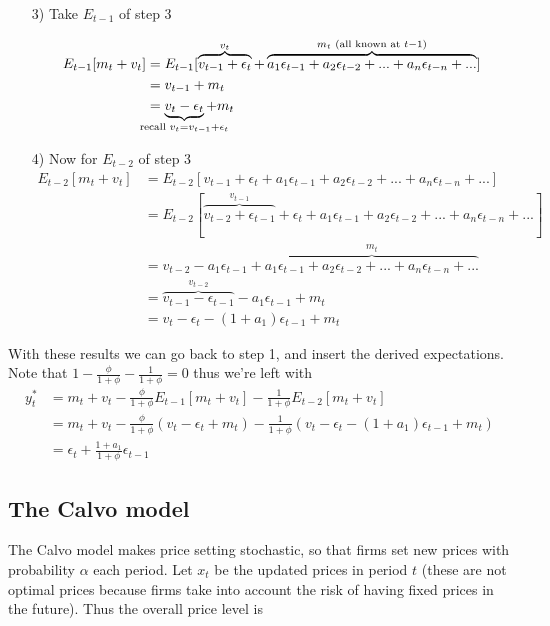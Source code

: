 \documentclass[12pt, a4paper]{article}
\begin{document}
\begin{spacing}{1.213}
\begin{itemize}
\item[3)] Take $E_{t-1}$ of step 3

\begin{align*}
E_{t-1}[m_t + v_t] &= E_{t-1}[\overbrace{v_{t-1} + \epsilon_t}^{v_t} + \overbrace { a_1 \epsilon_{t-1} + a_2 \epsilon_{t-2} + ... + a_{n} \epsilon_{t-n} + ...}^{m_t \textrm{ (all known at }t-1)}] \\
& = v_{t-1} + m_t \\
& = \underbrace{v_t - \epsilon_t}_{\mathclap{\textrm{recall }v_t = v_{t-1} + \epsilon_t }} + m_t
\end{align*}

\item[4)] Now for $E_{t-2}$ of step 3
\begin{align*}
E_{t-2}[m_t + v_t] &= E_{t-2}[v_{t-1} + \epsilon_t +  a_1 \epsilon_{t-1} + a_2 \epsilon_{t-2} + ... + a_{n} \epsilon_{t-n} + ...] \\
& = E_{t-2}[\overbrace{v_{t-2}+ \epsilon_{t-1}}^{v_{t-1}} + \epsilon_t +  a_1 \epsilon_{t-1} + a_2 \epsilon_{t-2} + ... + a_{n} \epsilon_{t-n} + ...] \\
& = v_{t-2} -a_1 \epsilon_{t-1} + \overbrace{a_1 \epsilon_{t-1} + a_2 \epsilon_{t-2} + ... + a_{n} \epsilon_{t-n} + ...}^{m_t} \\
& = \overbrace{v_{t-1} - \epsilon_{t-1}}^{v_{t-2}} -a_1 \epsilon_{t-1} + m_t \\
& = v_t - \epsilon_t - (1+a_1)\epsilon_{t-1} + m_t 
\end{align*}
\end{itemize}
With these results we can go back to step 1, and insert the derived expectations. Note that $1- \frac{\phi}{1+\phi}-\frac{1}{1+\phi} = 0$ thus we're left with
\begin{align*}
y_t^* &= m_t + v_t - \frac{\phi}{1+ \phi} E_{t-1}[m_t + v_t] - \frac{1}{1+ \phi} E_{t-2}[m_t + v_t] \\
& = m_t + v_t - \frac{\phi}{1 + \phi}(v_t - \epsilon_t + m_t) - \frac{1}{1+ \phi} (v_t - \epsilon_t - (1+a_1)\epsilon_{t-1} + m_t) \\
& = \epsilon_t + \frac{1+ a_1}{1+ \phi} \epsilon_{t-1}
\end{align*}

\subsection{The Calvo model}
The Calvo model makes price setting stochastic, so that firms set new prices with probability $\alpha$ each period. Let $x_t$ be the updated prices in period $t$ (these are not optimal prices because firms take into account the risk of having fixed prices in the future). Thus the overall price level is 


\end{spacing}
\end{document}
